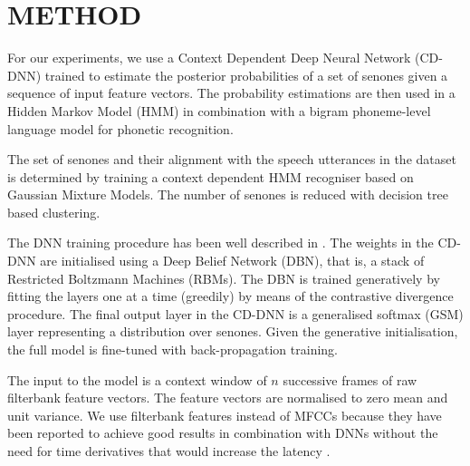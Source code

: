 \section{METHOD}
\label{sec:method}
For our experiments, we use a Context Dependent Deep Neural Network (CD-DNN) trained to estimate the posterior probabilities of a set of senones given a sequence of input feature vectors. The probability estimations are then used in a Hidden Markov Model (HMM) in combination with a bigram phoneme-level language model for phonetic recognition.

The set of senones and their alignment with the speech utterances in the dataset is determined by training a context dependent HMM recogniser based on Gaussian Mixture Models.
The number of senones is reduced with decision tree based clustering.

The DNN training procedure has been well described in \cite{dbn09}.
The weights in the CD-DNN are initialised using a Deep Belief Network (DBN), that is, a stack of Restricted Boltzmann Machines (RBMs).
The DBN is trained generatively by fitting the layers one at a time (greedily) by means of the contrastive divergence procedure.
The final output layer in the CD-DNN is a generalised softmax (GSM) layer representing a distribution over senones.
Given the generative initialisation, the full model is fine-tuned with back-propagation training.

The input to the model is a context window of $n$ successive frames of raw filterbank feature vectors.
The feature vectors are normalised to zero mean and unit variance.
We use filterbank features instead of MFCCs because they have been reported to achieve good results in combination with DNNs without the need for time derivatives that would increase the latency \cite{Jaitly2014Thesis}.

